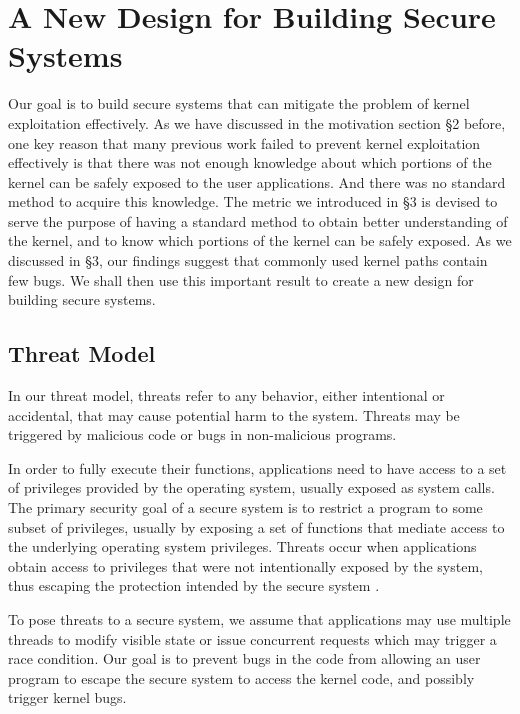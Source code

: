 \section{A New Design for Building Secure Systems}
\label{sec.design}

Our goal is to build secure systems that can mitigate the problem of kernel exploitation effectively. 
As we have discussed in the motivation section \S{2} before, one key reason that many previous work 
failed to prevent kernel exploitation effectively is that there was not enough knowledge about 
which portions of the kernel can be safely exposed to the user applications. 
And there was no standard method to acquire this knowledge. 
The metric we introduced in \S{3} is devised to serve the purpose of having a standard method to 
obtain better understanding of the kernel, and to know which portions of the kernel can be safely exposed. 
As we discussed in \S{3}, our findings suggest that commonly used kernel paths contain few bugs.
We shall then use this important result to create a new design for building secure systems. 

\subsection{Threat Model}
In our threat model, threats refer to any behavior, either intentional or accidental, that may cause potential harm 
to the system. Threats may be triggered by malicious code or bugs in non-malicious programs.

In order to fully execute their functions, applications need to have access to a set of privileges provided by 
the operating system, usually exposed as system calls. The primary security goal of a secure system is to 
restrict a program to some subset of privileges, usually by exposing a set of functions that mediate 
access to the underlying operating system privileges. Threats occur when applications obtain access to 
privileges that were not intentionally exposed by the system, thus escaping the protection 
intended by the secure system \cite{Repy:10}.

To pose threats to a secure system, we assume that applications may use multiple threads to modify visible 
state or issue concurrent requests which may trigger a race condition. Our goal is to prevent bugs in 
the code from allowing an user program to escape the secure system to access the kernel code, and 
possibly trigger kernel bugs.

